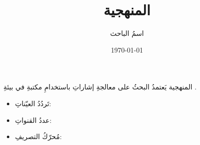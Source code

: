 \documentclass{beamer}
\title{المنهجية}
\author{اسمُ الباحث}
\institute{الجامعة}
\date{\today}
\begin{document}
\begin{frame}{المنهجية}
  يَعتمدُ البحثُ على معالجةِ إشاراتِ
   باستخدامِ مكتبةِ
   في بيئةِ
  .

  \begin{itemize}
    \item تَردُدُ العيّناتِ: 
    \item عددُ القنواتِ: 
    \item مُحرّكُ التصريفِ: 
  \end{itemize}
\end{frame}
\end{document}

